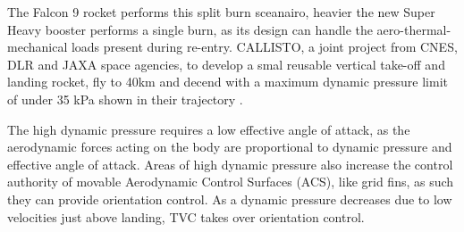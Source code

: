 The Falcon 9 rocket performs this split burn sceanairo, heavier the new Super Heavy booster performs a single burn, as its design can handle the aero-thermal-mechanical loads present during re-entry. CALLISTO, a joint project from CNES, DLR and JAXA space agencies, to develop a smal reusable vertical take-off and landing rocket, fly to 40km and decend with a maximum dynamic pressure limit of under 35 kPa shown in their trajectory \cite{Desmariaux2019CALLISTO}.

The high dynamic pressure requires a low effective angle of attack, as the aerodynamic forces acting on the body are proportional to dynamic pressure and effective angle of attack. Areas of high dynamic pressure also increase the control authority of movable Aerodynamic Control Surfaces (ACS), like grid fins, as such they can provide orientation control. As a dynamic pressure decreases due to low velocities just above landing, TVC takes over orientation control.